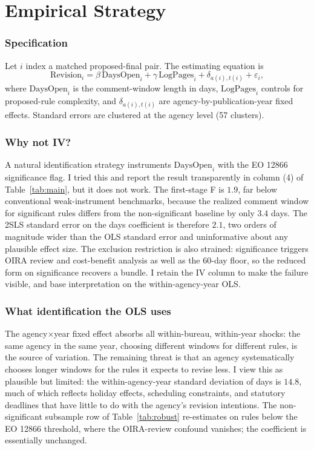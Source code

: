 \documentclass[12pt]{article}
\begin{document}


\section{Empirical Strategy}

\subsubsection*{Specification} Let $i$ index a matched proposed-final pair. The estimating equation is
\begin{equation}
\text{Revision}_i = \beta\,\text{DaysOpen}_i + \gamma\,\text{LogPages}_i + \delta_{a(i),t(i)} + \varepsilon_i,
\label{eq:main}
\end{equation}
where $\text{DaysOpen}_i$ is the comment-window length in days, $\text{LogPages}_i$ controls for proposed-rule complexity, and $\delta_{a(i),t(i)}$ are agency-by-publication-year fixed effects. Standard errors are clustered at the agency level (57 clusters).

\subsubsection*{Why not IV?} A natural identification strategy instruments $\text{DaysOpen}_i$ with the EO 12866 significance flag. I tried this and report the result transparently in column (4) of Table~\ref{tab:main}, but it does not work. The first-stage F is $1.9$, far below conventional weak-instrument benchmarks, because the realized comment window for significant rules differs from the non-significant baseline by only $3.4$ days. The 2SLS standard error on the days coefficient is therefore $2.1$, two orders of magnitude wider than the OLS standard error and uninformative about any plausible effect size. The exclusion restriction is also strained: significance triggers OIRA review and cost-benefit analysis as well as the 60-day floor, so the reduced form on significance recovers a bundle. I retain the IV column to make the failure visible, and base interpretation on the within-agency-year OLS.

\subsubsection*{What identification the OLS uses} The agency$\times$year fixed effect absorbs all within-bureau, within-year shocks: the same agency in the same year, choosing different windows for different rules, is the source of variation. The remaining threat is that an agency systematically chooses longer windows for the rules it expects to revise less. I view this as plausible but limited: the within-agency-year standard deviation of days is $14.8$, much of which reflects holiday effects, scheduling constraints, and statutory deadlines that have little to do with the agency's revision intentions. The non-significant subsample row of Table~\ref{tab:robust} re-estimates on rules below the EO 12866 threshold, where the OIRA-review confound vanishes; the coefficient is essentially unchanged.
\end{document}
